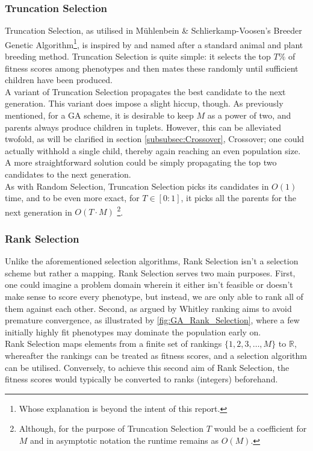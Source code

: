 \subsubsection{Truncation Selection}
Truncation Selection\cite{Wiki-truncation-selection}, as utilised in Mühlenbein \& Schlierkamp-Voosen's\cite{Truncation-Selection-Breeder-Algorithm} Breeder Genetic Algorithm\footnote{Whose explanation is beyond the intent of this report.}, is inspired by and named after a standard animal and plant breeding method. Truncation Selection is quite simple: it selects the top $T\%$ of fitness scores among phenotypes and then mates these randomly until sufficient children have been produced.
\\
A variant of Truncation Selection propagates the best candidate to the next generation. This variant does impose a slight hiccup, though. As previously mentioned, for a GA scheme, it is desirable to keep $M$ as a power of two, and parents always produce children in tuplets. However, this can be alleviated twofold, as will be clarified in section \ref{subsubsec:Crossover}, Crossover; one could actually withhold a single child, thereby again reaching an even population size. A more straightforward solution could be simply propagating the top two candidates to the next generation.
\\
As with Random Selection, Truncation Selection picks its candidates in $O(1)$ time, and to be even more exact, for $T \in [0:1]$, it picks all the parents for the next generation in $O(T \cdot M)$ \footnote{Although, for the purpose of Truncation Selection $T$ would be a coefficient for $M$ and in asymptotic notation the runtime remains as $O(M)$.}.

\subsubsection{Rank Selection}
Unlike the aforementioned selection algorithms, Rank Selection isn't a selection scheme but rather a mapping. Rank Selection serves two main purposes. First, one could imagine a problem domain wherein it either isn't feasible or doesn't make sense to score every phenotype, but instead, we are only able to rank all of them against each other. Second, as argued by Whitley\cite{Rank-Selection-Usefullness} ranking aims to avoid premature convergence, as illustrated by \autoref{fig:GA_Rank_Selection}, where a few initially highly fit phenotypes may dominate the population early on.
\\
Rank Selection maps elements from a finite set of rankings $\{1, 2, 3, \hdots, M\}$ to $\mathbb{R}$, whereafter the rankings can be treated as fitness scores, and a selection algorithm can be utilised. Conversely, to achieve this second aim of Rank Selection, the fitness scores would typically be converted to ranks (integers) beforehand.


